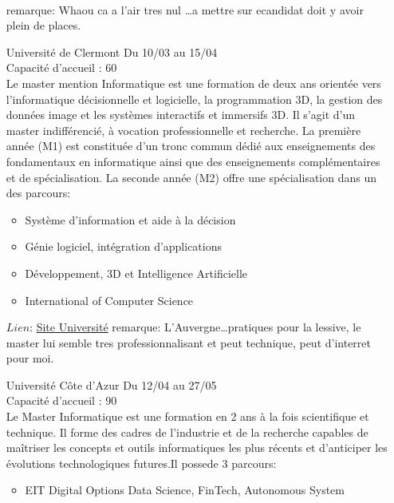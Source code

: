 \documentclass[a4paper,11pt]{article}
\begin{document}
\begin{enumerate}
                \\remarque: Whaou ca a l'air tres nul \ldots a mettre sur ecandidat doit y avoir plein de places.
\\
        \item [\color{LightOrangeHaf}Université de Clermont] Du 10/03 au 15/04
                \\Capacité d'accueil : 60
                \\Le master mention Informatique est une formation de deux ans orientée vers l'informatique décisionnelle et logicielle, la programmation 3D, la gestion des données image et les systèmes interactifs et immersifs 3D. Il s’agit d’un master indifférencié, à vocation professionnelle et recherche. La première année (M1) est constituée d'un tronc commun dédié aux enseignements des fondamentaux en informatique ainsi que des enseignements complémentaires et de spécialisation. La seconde année (M2) offre une spécialisation dans un des parcours:
                \begin{itemize}
                    \item Système d'information et aide à la décision
                    \item Génie logiciel, intégration d’applications
                    \item Développement, 3D et Intelligence Artificielle
                    \item International of Computer Science
                \end{itemize}
                $Lien$: \href{https://www.uca.fr/formation/nos-formations/catalogue-des-formations/master-info}{Site Université}
                remarque: L'Auvergne\dots pratiques pour la lessive, le master lui semble tres professionnalisant et peut technique, peut d'interret pour moi.
\\
        \item [\color{LightOrangeHaf}Université  Côte d'Azur] Du 12/04 au 27/05
                \\Capacité d'accueil : 90
                \\Le Master Informatique est une formation en 2 ans à la fois scientifique et technique. Il forme des cadres de l’industrie et de la recherche capables de maîtriser les concepts et outils informatiques les plus récents et d’anticiper les évolutions technologiques futures.Il possede 3 parcours:
                \begin{itemize}
                    \item EIT Digital Options Data Science, FinTech, Autonomous System

\end{itemize}
\end{enumerate}
\end{document}
